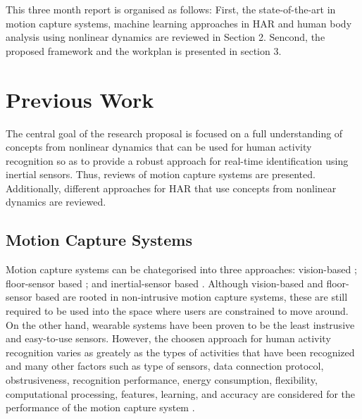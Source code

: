 \documentclass{sigchi}
\begin{document}

This three month report is organised as follows: First,
the state-of-the-art in motion capture systems, machine learning approaches in HAR
and human body analysis using nonlinear dynamics are reviewed in Section 2. Sencond, 
the proposed framework and the workplan is presented in section 3.

\section{Previous Work}

The central goal of the research proposal is focused on a full understanding of 
concepts from nonlinear dynamics that can be used for human activity recognition 
so as to provide a robust approach for real-time identification using inertial sensors.
Thus, reviews of motion capture systems are presented. Additionally, 
different approaches for HAR 
that use concepts from nonlinear dynamics are reviewed. 

\subsection{Motion Capture Systems}
Motion capture systems can be chategorised into three approaches: 
vision-based \cite{Forsyth2005}; 
floor-sensor based
\cite{Paradiso1997,Steinhage2008,Aguilar2007,Wimmer2011,Yin2003,Moere2004,
Richardson2004,Srinivasan2005, Rangarajan2008,Visell2010, Rajalingham2010}
; and inertial-sensor based
\cite{Razak2012,Bamberg2008,Benocci2009,Xu2012,Holleczek2010}.
Although vision-based and floor-sensor based are rooted in non-intrusive 
motion capture systems, these are still required to be used into the space 
where users are constrained to move around.
On the other hand, wearable systems have been proven to be the least instrusive 
and easy-to-use sensors. However, the choosen approach for human activity 
recognition varies as greately as the 
types of activities that have been recognized 
and many other factors such as type of sensors, data connection protocol, obstrusiveness, 
recognition performance, energy consumption, flexibility, computational processing,
features, learning, and accuracy 
are considered for the performance of the motion capture system \cite{Lara2013}.
\end{document}
